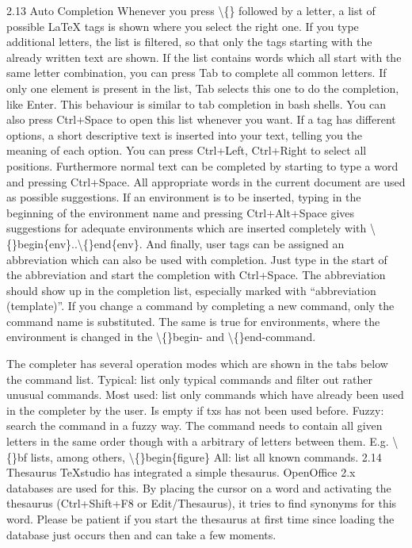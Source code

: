 \documentclass{article}
\begin{document}
	2.13 Auto Completion
	Whenever you press \textbackslash\{\} followed by a letter, a list of possible LaTeX tags is shown where you select the right one. If you type additional letters, the list is filtered, so that only the tags starting with the already written text are shown. If the list contains words which all start with the same letter combination, you can press Tab to complete all common letters. If only one element is present in the list, Tab selects this one to do the completion, like Enter. This behaviour is similar to tab completion in bash shells. You can also press Ctrl+Space to open this list whenever you want.
	If a tag has different options, a short descriptive text is inserted into your text, telling you the meaning of each option. You can press Ctrl+Left, Ctrl+Right to select all positions.
	Furthermore normal text can be completed by starting to type a word and pressing Ctrl+Space. All appropriate words in the current document are used as possible suggestions.
	If an environment is to be inserted, typing in the beginning of the environment name and pressing Ctrl+Alt+Space gives suggestions for adequate environments which are inserted completely with \textbackslash\{\}begin\{env\}..\textbackslash\{\}end\{env\}.
	And finally, user tags can be assigned an abbreviation which can also be used with completion. Just type in the start of the abbreviation and start the completion with Ctrl+Space. The abbreviation should show up in the completion list, especially marked with “abbreviation (template)”.
	If you change a command by completing a new command, only the command name is substituted. The same is true for environments, where the environment is changed in the \textbackslash\{\}begin- and \textbackslash\{\}end-command.
	
	The completer has several operation modes which are shown in the tabs below the command list.
	Typical: list only typical commands and filter out rather unusual commands.
	Most used: list only commands which have already been used in the completer by the user. Is empty if txs has not been used before.
	Fuzzy: search the command in a fuzzy way. The command needs to contain all given letters in the same order though with a arbitrary of letters between them. E.g. \textbackslash\{\}bf lists, among others, \textbackslash\{\}begin\{figure\}
	All: list all known commands.
	2.14 Thesaurus
	TeXstudio has integrated a simple thesaurus. OpenOffice 2.x databases are used for this. By placing the cursor on a word and activating the thesaurus (Ctrl+Shift+F8 or Edit/Thesaurus), it tries to find synonyms for this word. Please be patient if you start the thesaurus at first time since loading the database just occurs then and can take a few moments.
	
\end{document}
